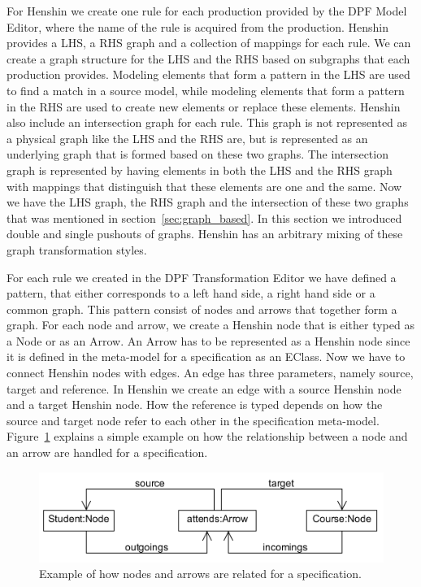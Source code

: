 For Henshin we create one rule for each production provided by the DPF Model
Editor, where the name of the rule is acquired from the production. Henshin
provides a LHS, a RHS graph and a collection of mappings for each rule. We can
create a graph structure for the LHS and the RHS based on subgraphs that each
production provides. Modeling elements that form a pattern in the LHS are used
to find a match in a source model, while modeling elements that form a pattern
in the RHS are used to create new elements or replace these elements. Henshin
also include an intersection graph for each rule. This graph is not represented
as a physical graph like the LHS and the RHS are, but is represented as an
underlying graph that is formed based on these two graphs. The intersection
graph is represented by having elements in both the LHS and the RHS graph with mappings
that distinguish that these elements are one and the same. Now we have the LHS
graph, the RHS graph and the intersection of these two graphs that was
mentioned in section~\ref{sec:graph_based}. In this section we introduced double
and single pushouts of graphs. Henshin has an arbitrary mixing of these graph
transformation styles.

For each rule we created in the DPF Transformation Editor we have defined a
pattern, that either corresponds to a left hand side, a right hand side or a
common graph. This pattern consist of nodes and arrows that together form a
graph. For each node and arrow, we create a Henshin node that is either typed
as a Node or as an Arrow. An Arrow has to be represented as a Henshin node since
it is defined in the meta-model for a specification as an EClass. Now we have to
connect Henshin nodes with edges. An edge has three parameters, namely source,
target and reference. In Henshin we create an edge with a source Henshin node
and a target Henshin node. How the reference is typed depends on how the
source and target node refer to each other in the specification meta-model.
Figure~\ref{fig:arrow_node_relate} explains a simple example on how
the relationship between a node and an arrow are handled for a specification.

\begin{figure}[H] 
	\centering
	\includegraphics[scale=0.8]{./Figures/arrow_node_relate.png}
	\caption[Relationship between node and arrow in DPF]
	{Example of how nodes and arrows are related for a specification.}
	\label{fig:arrow_node_relate}
\end{figure}

